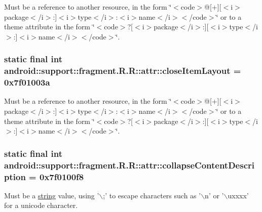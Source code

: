 Must be a reference to another resource, in the form \char`\"{}$<$code$>$@\mbox{[}+\mbox{]}\mbox{[}$<$i$>$package$<$/i$>$:\mbox{]}$<$i$>$type$<$/i$>$:$<$i$>$name$<$/i$>$$<$/code$>$\char`\"{} or to a theme attribute in the form \char`\"{}$<$code$>$?\mbox{[}$<$i$>$package$<$/i$>$:\mbox{]}\mbox{[}$<$i$>$type$<$/i$>$:\mbox{]}$<$i$>$name$<$/i$>$$<$/code$>$\char`\"{}. \hypertarget{classandroid_1_1support_1_1fragment_1_1_r_1_1attr_4d6d449541f3138a58e192bcf1a79f1c}{
\subsubsection[{closeItemLayout}]{\setlength{\rightskip}{0pt plus 5cm}static final int android::support::fragment.R.R::attr::closeItemLayout = 0x7f01003a}}
\label{classandroid_1_1support_1_1fragment_1_1_r_1_1attr_4d6d449541f3138a58e192bcf1a79f1c}


Must be a reference to another resource, in the form \char`\"{}$<$code$>$@\mbox{[}+\mbox{]}\mbox{[}$<$i$>$package$<$/i$>$:\mbox{]}$<$i$>$type$<$/i$>$:$<$i$>$name$<$/i$>$$<$/code$>$\char`\"{} or to a theme attribute in the form \char`\"{}$<$code$>$?\mbox{[}$<$i$>$package$<$/i$>$:\mbox{]}\mbox{[}$<$i$>$type$<$/i$>$:\mbox{]}$<$i$>$name$<$/i$>$$<$/code$>$\char`\"{}. \hypertarget{classandroid_1_1support_1_1fragment_1_1_r_1_1attr_e3c2bb53844c01ffa8485ecc08409a44}{
\subsubsection[{collapseContentDescription}]{\setlength{\rightskip}{0pt plus 5cm}static final int android::support::fragment.R.R::attr::collapseContentDescription = 0x7f0100f8}}
\label{classandroid_1_1support_1_1fragment_1_1_r_1_1attr_e3c2bb53844c01ffa8485ecc08409a44}


Must be a \hyperlink{classandroid_1_1support_1_1fragment_1_1_r_1_1string}{string} value, using '$\backslash$;' to escape characters such as '$\backslash$n' or '$\backslash$uxxxx' for a unicode character. 

